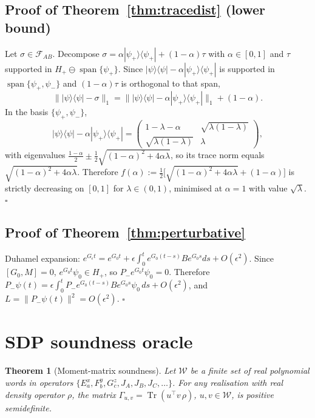 \documentclass[a4paper,onecolumn,noarxiv]{quantumarticle}
\theoremstyle{plain}
\newtheorem{theorem}{Theorem}
\theoremstyle{definition}
\theoremstyle{remark}
\newcommand{\Pminus}{P_{-}}
\newcommand{\Hplus}{H_{+}}
\newcommand{\Mop}{M}
\newcommand{\FAB}{\mathcal{F}_{AB}}
\newcommand{\Tr}{\operatorname{Tr}}
\newcommand{\Lleak}{L}
\begin{document}
\subsection*{Proof of Theorem~\ref{thm:tracedist} (lower bound)}

Let $\sigma\in\FAB$. Decompose $\sigma=\alpha|\psi_+\rangle\langle\psi_+|+(1-\alpha)\tau$
with $\alpha\in[0,1]$ and $\tau$ supported in $\Hplus\ominus\operatorname{span}\{\psi_+\}$.
Since $|\psi\rangle\langle\psi|-\alpha|\psi_+\rangle\langle\psi_+|$ is supported in
$\operatorname{span}\{\psi_+,\psi_-\}$ and $(1-\alpha)\tau$ is orthogonal to that
span,
\[
  \bigl\||\psi\rangle\langle\psi|-\sigma\bigr\|_1
  = \bigl\||\psi\rangle\langle\psi|-\alpha|\psi_+\rangle\langle\psi_+|\bigr\|_1
  + (1-\alpha).
\]
In the basis $\{\psi_+,\psi_-\}$,
\[
  |\psi\rangle\langle\psi|-\alpha|\psi_+\rangle\langle\psi_+|
  = \begin{pmatrix} 1-\lambda-\alpha & \sqrt{\lambda(1-\lambda)} \\
    \sqrt{\lambda(1-\lambda)} & \lambda \end{pmatrix},
\]
with eigenvalues $\tfrac{1-\alpha}{2}\pm\tfrac{1}{2}\sqrt{(1-\alpha)^2+4\alpha\lambda}$,
so its trace norm equals $\sqrt{(1-\alpha)^2+4\alpha\lambda}$. Therefore
$f(\alpha):=\tfrac{1}{2}\bigl[\sqrt{(1-\alpha)^2+4\alpha\lambda}+(1-\alpha)\bigr]$
is strictly decreasing on $[0,1]$ for $\lambda\in(0,1)$, minimised at $\alpha=1$
with value $\sqrt{\lambda}$. \hfill$\square$

\subsection*{Proof of Theorem~\ref{thm:perturbative}}

Duhamel expansion: $e^{G_\epsilon t}=e^{G_0 t}+\epsilon\int_0^t e^{G_0(t-s)}Be^{G_0 s}ds
+O(\epsilon^2)$. Since $[G_0,\Mop]=0$, $e^{G_0 t}\psi_0\in\Hplus$, so
$\Pminus e^{G_0 t}\psi_0=0$. Therefore
$\Pminus\psi(t)=\epsilon\int_0^t\Pminus e^{G_0(t-s)}Be^{G_0 s}\psi_0\,ds+O(\epsilon^2)$,
and $\Lleak=\|\Pminus\psi(t)\|^2=O(\epsilon^2)$. \hfill$\square$

\section{SDP soundness oracle}
\label{app:sdp}

\begin{theorem}[Moment-matrix soundness]
\label{thm:moments}
Let $\mathcal{W}$ be a finite set of real polynomial words in operators
$\{E_a^x,F_b^y,G_c^z,J_A,J_B,J_C,\ldots\}$. For any realisation with real density
operator $\rho$, the matrix $\Gamma_{u,v}=\Tr(u^\top v\,\rho)$, $u,v\in\mathcal{W}$,
is positive semidefinite.
\end{theorem}
\end{document}
